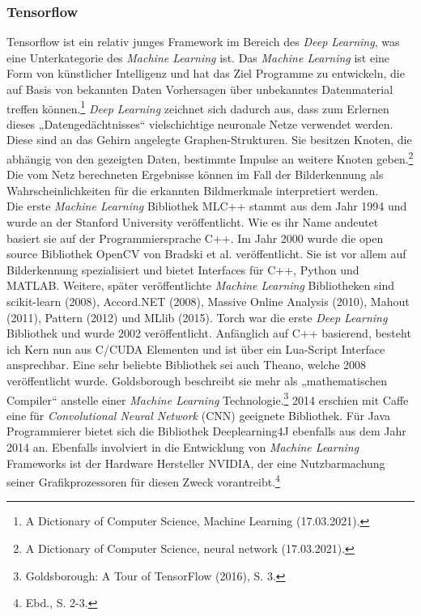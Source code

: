 \documentclass[a4paper,12pt,ngerman]{article}
\begin{document}
\subsubsection{Tensorflow}
Tensorflow ist ein relativ junges Framework im Bereich des \textit{Deep Learning}, was eine Unterkategorie des \textit{Machine Learning} ist. Das \textit{Machine Learning} ist eine Form von künstlicher Intelligenz und hat das Ziel Programme zu entwickeln, die auf Basis von bekannten Daten Vorhersagen über unbekanntes Datenmaterial treffen können.\footnote{A Dictionary of Computer Science, Machine Learning (17.03.2021).}  \textit{Deep Learning} zeichnet sich dadurch aus, dass zum Erlernen dieses „Datengedächtnisses“ vielschichtige neuronale Netze verwendet werden. Diese sind an das Gehirn angelegte Graphen-Strukturen. Sie besitzen Knoten, die abhängig von den gezeigten Daten, bestimmte Impulse an weitere Knoten geben.\footnote{A Dictionary of Computer Science, neural network (17.03.2021).} Die vom Netz berechneten Ergebnisse können im Fall der Bilderkennung als Wahrscheinlichkeiten für die erkannten Bildmerkmale interpretiert werden. \\
Die erste \textit{Machine Learning} Bibliothek MLC++ stammt aus dem Jahr 1994 und wurde an der Stanford University veröffentlicht. Wie es ihr Name andeutet basiert sie auf der Programmiersprache C++. Im Jahr 2000 wurde die open source Bibliothek OpenCV von Bradski et al. veröffentlicht. Sie ist vor allem auf Bilderkennung spezialisiert und bietet Interfaces für C++, Python und MATLAB. Weitere, später veröffentlichte \textit{Machine Learning} Bibliotheken sind scikit-learn (2008), Accord.NET (2008), Massive Online Analysis (2010), Mahout (2011), Pattern (2012) und MLlib (2015). Torch war die erste \textit{Deep Learning} Bibliothek und wurde 2002 veröffentlicht. Anfänglich auf C++ basierend, besteht ich Kern nun aus C/CUDA Elementen und ist über ein Lua-Script Interface ansprechbar. Eine sehr beliebte Bibliothek sei auch Theano, welche 2008 veröffentlicht wurde. Goldsborough beschreibt sie mehr als „mathematischen Compiler“ anstelle einer \textit{Machine Learning} Technologie.\footnote{Goldsborough: A Tour of TensorFlow (2016), S. 3.}  2014 erschien mit Caffe eine für \textit{Convolutional Neural Network} (CNN) geeignete Bibliothek. Für Java Programmierer bietet sich die Bibliothek Deeplearning4J ebenfalls aus dem Jahr 2014 an. Ebenfalls involviert in die Entwicklung von \textit{Machine Learning} Frameworks ist der Hardware Hersteller NVIDIA, der eine Nutzbarmachung seiner Grafikprozessoren für diesen Zweck vorantreibt.\footnote{Ebd., S. 2-3.} \\
\end{document}
